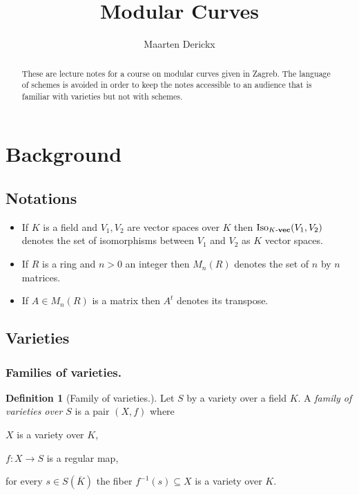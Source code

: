 \documentclass[a4paper,12pt,reqno]{amsart}
\title{Modular Curves}
\author{Maarten Derickx}
\newcommand{\IsoKVec}[1]{\mathrm{Iso}_{#1 {\bf\text{-}vec}}}
\newcommand{\transpose}{t}
\theoremstyle{definition}
\newtheorem{definition}[lemma]{Definition}
\numberwithin{lemma}{section}
\numberwithin{equation}{section}
\numberwithin{figure}{section}
\begin{document}
\begin{abstract}
These are lecture notes for a course on modular curves given in Zagreb. The language of schemes is avoided in order to keep the notes accessible to an audience that is familiar with varieties but not with schemes.
\end{abstract}

\maketitle
\setcounter{tocdepth}{3}
\tableofcontents

\section{Background}

\subsection{Notations}

\begin{itemize}
	\item If $K$ is a field and $V_1,V_2$ are vector spaces over $K$ then $\IsoKVec{K}(V_1,V_2)$ denotes the set of isomorphisms between $V_1$ and $V_2$ as $K$ vector spaces.
	\item If $R$ is a ring and $n >0 $ an integer then $M_n(R)$ denotes the set of $n$ by $n$ matrices.
	\item If $A \in M_n(R)$ is a matrix then $A^\transpose$ denotes its transpose. 
\end{itemize}

\newpage
\subsection{Varieties}



\hspace{1em}

\subsubsection{Families of varieties.}
\begin{definition}[Family of varieties.]\label{def:family-of-varieties}
Let $S$ by a variety over a field $K$. A \textit{family of varieties over $S$} is a pair $(X,f)$ where 
\begin{defenum}
	\item $X$ is a variety over $K$,
	\item $f: X \to S$ is a regular map,
	\item for every $s \in S(\overline K)$ the fiber $f^{-1}(s) \subseteq X$ is a variety over $K$. \label{def:family-of-varieties-fibers}
\end{defenum}
\end{definition}
\end{document}
